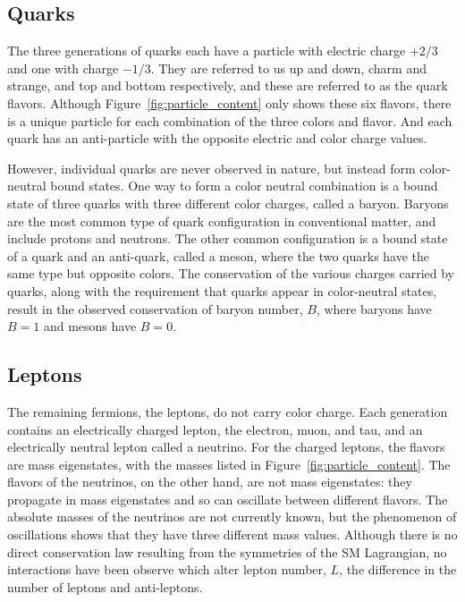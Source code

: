 \subsection{Quarks}

The three generations of quarks each have a particle with electric charge $+2/3$ and one with charge $-1/3$.
They are referred to us up and down, charm and strange, and top and bottom respectively, and these are referred to as the quark flavors.
Although Figure~\ref{fig:particle_content} only shows these six flavors, there is a unique particle for each combination of the three colors and flavor.
And each quark has an anti-particle with the opposite electric and color charge values.

However, individual quarks are never observed in nature, but instead form color-neutral bound states.
One way to form a color neutral combination is a bound state of three quarks with three different color charges, called a baryon.
Baryons are the most common type of quark configuration in conventional matter, and include protons and neutrons.
The other common configuration is a bound state of a quark and an anti-quark, called a meson, where the two quarks have the same type but opposite colors. 
The conservation of the various charges carried by quarks, along with the requirement that quarks appear in color-neutral states, result in the observed conservation of baryon number, $B$, where baryons have $B=1$ and mesons have $B=0$. 

\subsection{Leptons}

The remaining fermions, the leptons, do not carry color charge.
Each generation contains an electrically charged lepton, the electron, muon, and tau, and an electrically neutral lepton called a neutrino.
For the charged leptons, the flavors are mass eigenstates, with the masses listed in Figure~\ref{fig:particle_content}.
The flavors of the neutrinos, on the other hand, are not mass eigenstates: they propagate in mass eigenstates and so can oscillate between different flavors.
The absolute masses of the neutrinos are not currently known, but the phenomenon of oscillations shows that they have three different mass values.
Although there is no direct conservation law resulting from the symmetries of the \ac{SM} Lagrangian, no interactions have been observe which alter lepton number, $L$, the difference in the number of leptons and anti-leptons. 

